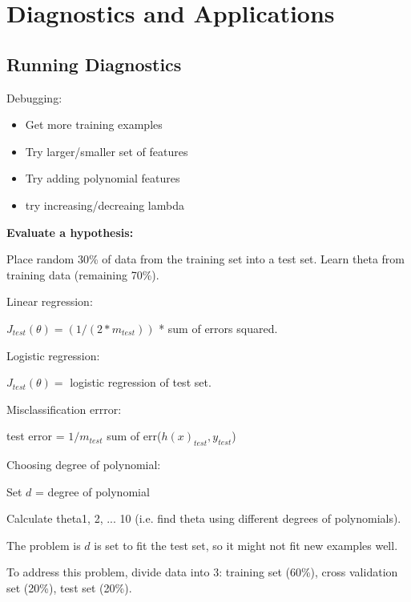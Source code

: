 \documentclass[12pt] {article}
\begin{document}
{  \newpage

\section{Diagnostics and Applications}

  \subsection{Running Diagnostics}

    Debugging:
    \vspace{-1em}
    \begin{itemize}
      \item Get more training examples
      \item Try larger/smaller set of features
      \item Try adding polynomial features
      \item try increasing/decreaing lambda
    \end{itemize}

    \textbf{Evaluate a hypothesis:}

    Place random 30\% of data from the training set into a test set.
    Learn theta from training data (remaining 70\%).

    Linear regression:
    
    $J_{test}(\theta) = (1/(2 * m_{test}))$ * sum of errors squared.
    
    Logistic regression:
    
    $J_{test}(\theta) =$ logistic regression of test set.
    
    Misclassification errror: 
    

    test error = $1/m_{test}$ sum of err($h(x)_{test}, y_{test}$)

    Choosing degree of polynomial: 
    
    Set $d$ = degree of polynomial

    Calculate theta1, 2, ... 10 (i.e. find theta using different degrees of 
    polynomials).

    The problem is $d$ is set to fit the test set, so it might not fit new 
    examples well.

    To address this problem, divide data into 3: training set (60\%), 
    cross validation set (20\%), test set (20\%). 

}
\end{document}
